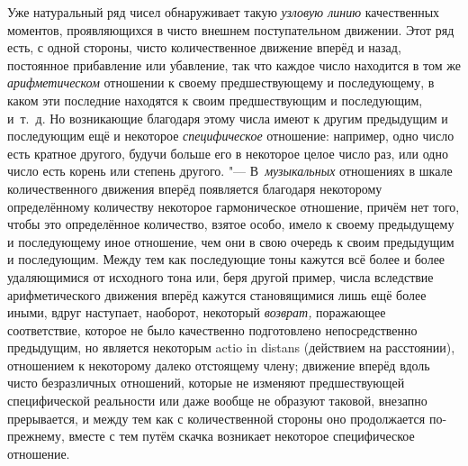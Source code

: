 Уже натуральный ряд чисел обнаруживает такую {\em узловую линию} качественных
моментов, проявляющихся в чисто внешнем поступательном движении. Этот ряд есть,
с одной стороны, чисто количественное движение вперёд и назад, постоянное
прибавление или убавление, так что каждое число находится в том же
{\em арифметическом} отношении к своему предшествующему и последующему, в каком
эти последние находятся к своим предшествующим и последующим, и~т.~д. Но
возникающие благодаря этому числа имеют к другим предыдущим и последующим ещё и
некоторое {\em специфическое} отношение: например, одно число есть кратное
другого, будучи больше его в некоторое целое число раз, или одно число есть
корень или степень другого. "--- В~{\em музыкальных} отношениях в шкале
количественного движения вперёд появляется благодаря некоторому определённому
количеству некоторое гармоническое отношение, причём нет того, чтобы это
определённое количество, взятое особо, имело к своему предыдущему и
последующему иное отношение, чем они в свою очередь к своим предыдущим и
последующим. Между тем как последующие тоны кажутся всё более и более
удаляющимися от исходного тона или, беря другой пример, числа вследствие
арифметического движения вперёд кажутся становящимися лишь ещё более иными,
вдруг наступает, наоборот, некоторый {\em возврат,} поражающее соответствие,
которое не было качественно подготовлено непосредственно предыдущим, но
является некоторым actio in distans (действием на расстоянии), отношением к
некоторому далеко отстоящему члену; движение вперёд вдоль чисто безразличных
отношений, которые не изменяют предшествующей специфической реальности или даже
вообще не образуют таковой, внезапно прерывается, и между тем как с
количественной стороны оно продолжается по-прежнему, вместе с тем путём скачка
возникает некоторое специфическое отношение.

